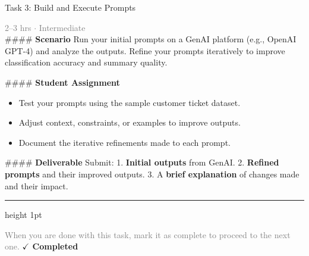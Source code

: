 \documentclass[10pt,a4paper]{article}
\begin{document}
\begin{taskbox}{Task 3: Build and Execute Prompts}

    {\small \textcolor{gray}{2--3 hrs $\cdot$ Intermediate}}\\[12pt]

    \#\#\#\# \textbf{Scenario}
Run your initial prompts on a GenAI platform (e.g., OpenAI GPT-4) and analyze the outputs. Refine your prompts iteratively to improve classification accuracy and summary quality.

\#\#\#\# \textbf{Student Assignment}
\begin{itemize}
    \item Test your prompts using the sample customer ticket dataset.
    \item Adjust context, constraints, or examples to improve outputs.
    \item Document the iterative refinements made to each prompt.
\end{itemize}

\#\#\#\# \textbf{Deliverable}
Submit:
1. \textbf{Initial outputs} from GenAI.
2. \textbf{Refined prompts} and their improved outputs.
3. A \textbf{brief explanation} of changes made and their impact.\par

    \vspace{16pt}

    \textcolor{cardBorder}{\hrule height 1pt}\vspace{8pt}

    \small \textcolor{gray}{When you are done with this task, mark it as complete to proceed to the next one.} \hfill \textbf{\textcolor{brandDark}{$\checkmark$ Completed}}

\end{taskbox}
\end{document}
